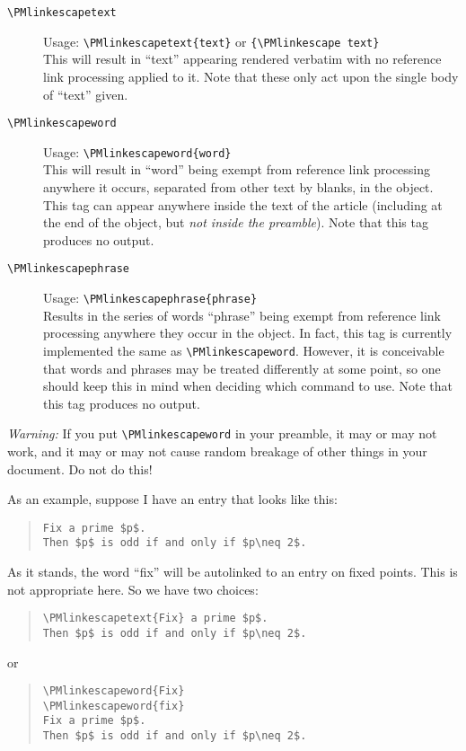 \begin{description}
\item [\texttt{\textbackslash{}PMlinkescapetext}]
 Usage: \texttt{\textbackslash{}PMlinkescapetext\{text\}} or \texttt{\{\textbackslash{}PMlinkescape text\}}\\
 This will result in ``text'' appearing rendered verbatim with no reference link processing applied to it. Note that these only act upon the single body of ``text'' given.
\item[\texttt{\textbackslash{}PMlinkescapeword}]
 Usage: \texttt{\textbackslash{}PMlinkescapeword\{word\}}\\
This will result in ``word'' being exempt from reference link processing anywhere it occurs, separated from other text by blanks, in the object. This tag can appear anywhere inside the text of the article (including at the end of the object, but \emph{not inside the preamble}). Note that this tag produces no output.
\item[\texttt{\textbackslash{}PMlinkescapephrase}]
 Usage: \texttt{\textbackslash{}PMlinkescapephrase\{phrase\}}\\
 Results in the series of words ``phrase'' being exempt from reference link processing anywhere they occur in the object. In fact, this tag is currently implemented the same as \texttt{\textbackslash{}PMlinkescapeword}. However, it is conceivable that words and phrases may be treated differently at some point, so one should keep this in mind when deciding which command to use. Note that this tag produces no output.
\end{description}

\emph{Warning:} If you put \texttt{\textbackslash{}PMlinkescapeword} in your preamble, it may or may not work, and it may or may not cause random breakage of other things in your document. Do not do this!

As an example, suppose I have an entry that looks like this:
\begin{quote}
\begin{verbatim}
Fix a prime $p$.
Then $p$ is odd if and only if $p\neq 2$.
\end{verbatim}
\end{quote}

As it stands, the word ``fix'' will be autolinked to an entry on fixed points. This is not appropriate here. So we have two choices:
\begin{quote}
\begin{verbatim}
\PMlinkescapetext{Fix} a prime $p$.
Then $p$ is odd if and only if $p\neq 2$.
\end{verbatim}
\end{quote}
or
\begin{quote}
\begin{verbatim}
\PMlinkescapeword{Fix}
\PMlinkescapeword{fix}
Fix a prime $p$.
Then $p$ is odd if and only if $p\neq 2$.
\end{verbatim}
\end{quote}

